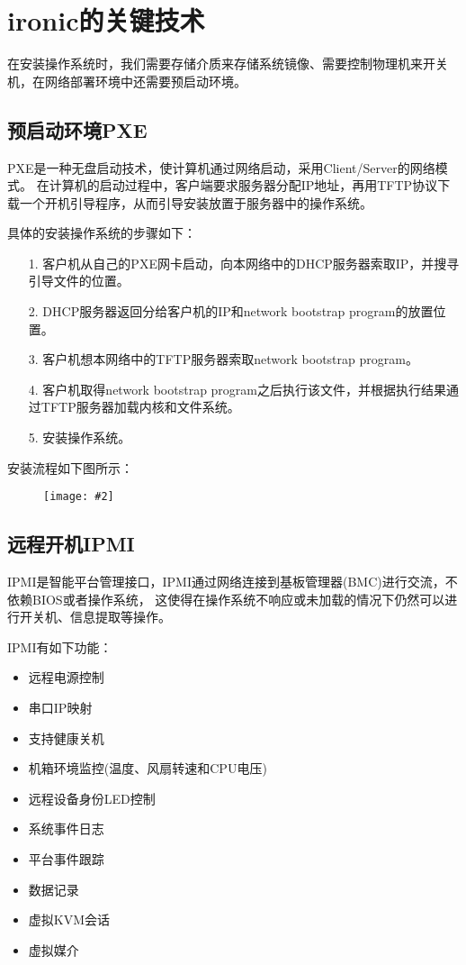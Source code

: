 \documentclass[a4paper,left=2.5cm,right=2.5cm,11pt]{article}
\newcommand{\sizedfic}[2]{\begin{figure}[H]
		\center
		\texttt{[image: \#2]}
	\end{figure}}
\begin{document}
\section{ironic的关键技术}
	在安装操作系统时，我们需要存储介质来存储系统镜像、需要控制物理机来开关机，在网络部署环境中还需要预启动环境。

\subsection{预启动环境PXE}
	PXE是一种无盘启动技术，使计算机通过网络启动，采用Client/Server的网络模式。
	在计算机的启动过程中，客户端要求服务器分配IP地址，再用TFTP协议下载一个开机引导程序，从而引导安装放置于服务器中的操作系统。\par

	具体的安装操作系统的步骤如下：
	\begin{itemize}
		\item[1.] 客户机从自己的PXE网卡启动，向本网络中的DHCP服务器索取IP，并搜寻引导文件的位置。
		\item[2.] DHCP服务器返回分给客户机的IP和network bootstrap program的放置位置。
		\item[3.] 客户机想本网络中的TFTP服务器索取network bootstrap program。
		\item[4.] 客户机取得network bootstrap program之后执行该文件，并根据执行结果通过TFTP服务器加载内核和文件系统。
		\item[5.] 安装操作系统。
	\end{itemize}

	安装流程如下图所示：
	\sizedfic{0.7}{2.jpg}

\subsection{远程开机IPMI}
	IPMI是智能平台管理接口，IPMI通过网络连接到基板管理器(BMC)进行交流，不依赖BIOS或者操作系统，
	这使得在操作系统不响应或未加载的情况下仍然可以进行开关机、信息提取等操作。\par

	IPMI有如下功能：
	\begin{itemize}
		\item 远程电源控制
		\item 串口IP映射
		\item 支持健康关机
		\item 机箱环境监控(温度、风扇转速和CPU电压)
		\item 远程设备身份LED控制
		\item 系统事件日志
		\item 平台事件跟踪
		\item 数据记录
		\item 虚拟KVM会话
		\item 虚拟媒介
	\end{itemize}
\end{document}
